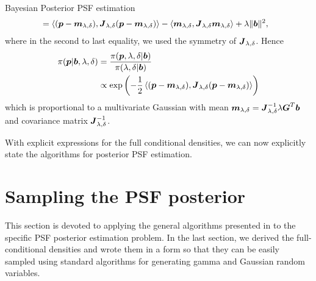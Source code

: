 \begin{chapter}{Bayesian Posterior PSF estimation}
\begin{align}
  &= \left\langle (\mbox{\boldmath$p$}-\mbox{\boldmath$m$}_{\lambda,\delta}),\mbox{\boldmath$J$}_{\lambda,\delta}(\mbox{\boldmath$p$} - \mbox{\boldmath$m$}_{\lambda,\delta})\right \rangle - \langle \mbox{\boldmath$m$}_{\lambda,\delta},\mbox{\boldmath$J$}_{\lambda,\delta}\mbox{\boldmath$m$}_{\lambda,\delta}\rangle + \lambda \|\mbox{\boldmath$b$}\|^2, \label{eq:completingSquare}
\end{align}
where in the second to last equality, we used the symmetry of $\mbox{\boldmath$J$}_{\lambda,\delta}$.
Hence 
\begin{align}
  \pi(\mbox{\boldmath$p$}|\mbox{\boldmath$b$},\lambda,\delta) 
    &= \frac{\pi(\mbox{\boldmath$p$},\lambda,\delta|\mbox{\boldmath$b$})}{\pi(\lambda,\delta|\mbox{\boldmath$b$}) } \nonumber\\
    &\propto \exp\left(-\frac 12\left\langle (\mbox{\boldmath$p$}-\mbox{\boldmath$m$}_{\lambda,\delta}),\mbox{\boldmath$J$}_{\lambda,\delta}(\mbox{\boldmath$p$} - \mbox{\boldmath$m$}_{\lambda,\delta})\right \rangle\right)\label{eq:gaussianLikelihood}
\end{align}
which is proportional to a multivariate Gaussian with mean $\mbox{\boldmath$m$}_{\lambda,\delta} = \mbox{\boldmath$J$}_{\lambda,\delta}^{-1}\lambda \mbox{\boldmath$G$}^T \mbox{\boldmath$b$}$ and covariance matrix $\mbox{\boldmath$J$}_{\lambda,\delta}^{-1}$.

With explicit expressions for the full conditional densities, we can now explicitly state the algorithms for posterior PSF estimation.

\section{Sampling the PSF posterior}

This section is devoted to applying the general algorithms presented in  to the specific PSF posterior estimation problem.  
In the last section, we derived the full-conditional densities and wrote them in a form so that they can be easily sampled using standard algorithms for generating gamma and Gaussian random variables.


\end{chapter}
